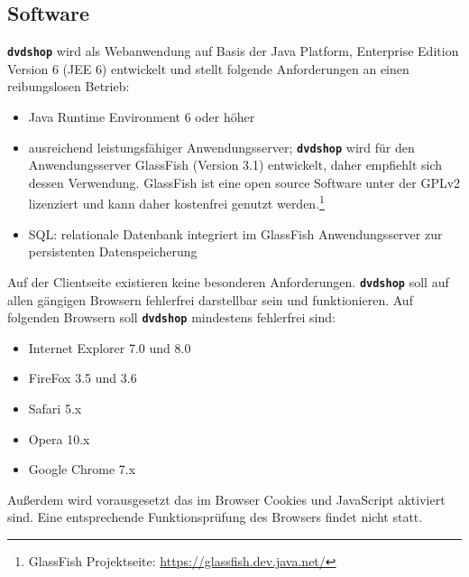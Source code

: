 \documentclass[12pt,oneside,a4paper,bibtotoc,liststotoc,pointlessnumbers]{scrartcl}
\begin{document}
\subsection{Software}
\texttt{\textbf{dvdshop}} wird als Webanwendung auf Basis der Java Platform, Enterprise Edition Version 6 (JEE 6) entwickelt und stellt folgende Anforderungen an einen reibungslosen Betrieb:
\begin{itemize}
\item Java Runtime Environment 6 oder höher
\item ausreichend leistungsfähiger Anwendungsserver; \texttt{\textbf{dvdshop}} wird für den Anwendungsserver GlassFish (Version 3.1) entwickelt, daher empfiehlt sich dessen Verwendung. GlassFish ist eine open source Software unter der GPLv2 lizenziert und kann daher kostenfrei genutzt werden.\footnote{GlassFish Projektseite: \url{https://glassfish.dev.java.net/}}
\item SQL: relationale Datenbank integriert im GlassFish Anwendungsserver zur persistenten Datenspeicherung
\end{itemize}
Auf der Clientseite existieren keine besonderen Anforderungen. \texttt{\textbf{dvdshop}} soll auf allen gängigen Browsern fehlerfrei darstellbar sein und funktionieren. Auf folgenden Browsern soll \texttt{\textbf{dvdshop}} mindestens fehlerfrei sind:
\begin{itemize}
\item Internet Explorer 7.0 und 8.0
\item FireFox 3.5 und 3.6
\item Safari 5.x
\item Opera 10.x
\item Google Chrome 7.x
\end{itemize}
Außerdem wird vorausgesetzt das im Browser Cookies und JavaScript aktiviert sind. Eine entsprechende Funktionsprüfung des Browsers findet nicht statt.
\end{document}
